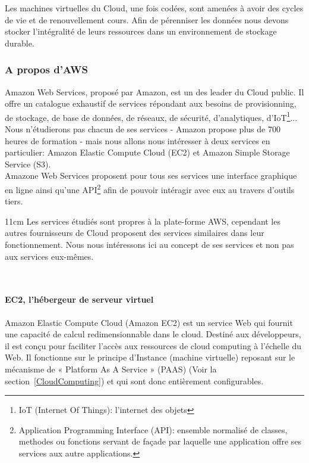       Les machines virtuelles du Cloud, une fois codées, sont amenées à avoir des cycles de vie et de renouvellement cours. Afin de pérenniser les données nous devons stocker l'intégralité de leurs ressources dans un environnement de stockage durable.

        \subsubsection{A propos d'AWS}
        Amazon Web Services, proposé par Amazon, est un des leader du Cloud public. Il offre un catalogue exhaustif de services répondant aux besoins de provisionning, de stockage, de base de données, de réseaux, de sécurité, d'analytiques, d'IoT\footnote{IoT (Internet Of Things): l'internet des objets}... Nous n'étudierons pas chacun de ses services - Amazon propose plus de 700 heures de formation - mais nous allons nous intéresser à deux services en particulier: Amazon Elastic Compute Cloud (EC2) et Amazon Simple Storage Service (S3).\\

        Amazone Web Services proposent pour tous ses services une interface graphique en ligne ainsi qu'une API\footnote{Application Programming Interface (API): ensemble normalisé de classes, methodes ou fonctions servant de façade par laquelle une application offre ses services aux autre applications.} afin de pouvoir intéragir avec eux au travers d'outils tiers.\\

        \begin {boxedminipage} {11cm}
          Les services étudiés sont propres à la plate-forme AWS, cependant les autres fournisseurs de Cloud proposent des services similaires dans leur fonctionnement. Nous nous intéressons ici au concept de ses services et non pas aux services eux-mêmes.
        \end {boxedminipage}\\

          \paragraph{EC2, l'hébergeur de serveur virtuel}
          Amazon Elastic Compute Cloud (Amazon EC2) est un service Web qui fournit une capacité de calcul redimensionnable dans le cloud. Destiné aux développeurs, il est conçu pour faciliter l'accès aux ressources de cloud computing à l'échelle du Web. Il fonctionne sur le principe d'Instance (machine virtuelle) reposant sur le mécanisme de « Platform As A Service » (PAAS) (Voir la section~\ref{CloudComputing}) et qui sont donc entièrement configurables.

